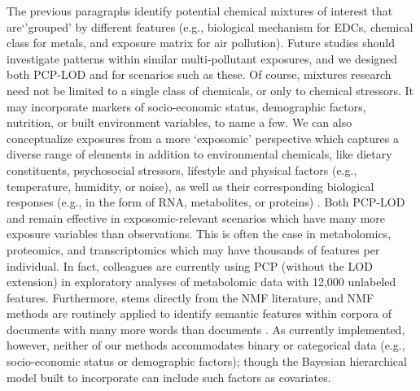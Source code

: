 The previous paragraphs identify potential chemical mixtures of interest that are`'grouped' by different features (e.g., biological mechanism for EDCs, chemical class for metals, and exposure matrix for air pollution). Future studies should investigate patterns within similar multi-pollutant exposures, and we designed both PCP-LOD and \bnmf for scenarios such as these. Of course, mixtures research need not be limited to a single class of chemicals, or only to chemical stressors. It may incorporate markers of socio-economic status, demographic factors, nutrition, or built environment variables, to name a few. We can also conceptualize exposures from a more `exposomic' perspective which captures a diverse range of elements in addition to environmental chemicals, like dietary constituents, psychosocial stressors, lifestyle and physical factors (e.g., temperature, humidity, or noise), as well as their corresponding biological responses (e.g., in the form of RNA, metabolites, or proteins) \cite{vermeulen2020exposome}. Both PCP-LOD and \bnmf remain effective in exposomic-relevant scenarios which have many more exposure variables than observations. This is often the case in metabolomics, proteomics, and transcriptomics which may have thousands of features per individual. In fact, colleagues are currently using PCP (without the LOD extension) in exploratory analyses of metabolomic data with 12,000 unlabeled features. Furthermore, \bnmf stems directly from the NMF literature, and NMF methods are routinely applied to identify semantic features within corpora of documents with many more words than documents \cite{blei2003latent, paisley2014bayesian}. As currently implemented, however, neither of our methods accommodates binary or categorical data (e.g., socio-economic status or demographic factors); though the Bayesian hierarchical model built to incorporate \bnmf can include such factors as covariates. %

